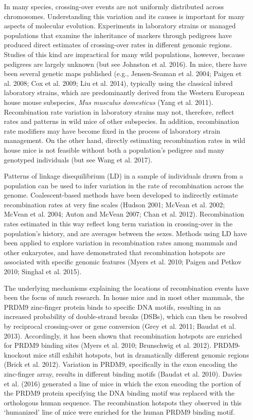 In many species, crossing-over events are not uniformly distributed across chromosomes. Understanding this variation and its causes is important for many aspects of molecular evolution. Experiments in laboratory strains or managed populations that examine the inheritance of markers through pedigrees have produced direct estimates of crossing-over rates in different genomic regions. Studies of this kind are impractical for many wild populations, however, because pedigrees are largely unknown (but see Johnston et al. 2016). In mice, there have been several genetic maps published (e.g., Jensen-Seaman et al. 2004; Paigen et al. 2008; Cox et al. 2009; Liu et al. 2014), typically using the classical inbred laboratory strains, which are predominantly derived from the Western European house mouse subspecies, \textit{Mus musculus domesticus} (Yang et al. 2011). Recombination rate variation in laboratory strains may not, therefore, reflect rates and patterns in wild mice of other subspecies. In addition, recombination rate modifiers may have become fixed in the process of laboratory strain management. On the other hand, directly estimating recombination rates in wild house mice is not feasible without both a population’s pedigree and many genotyped individuals (but see Wang et al. 2017). 
 
        	Patterns of linkage disequilibrium (LD) in a sample of individuals drawn from a population can be used to infer variation in the rate of recombination across the genome. Coalescent-based methods have been developed to indirectly estimate recombination rates at very fine scales (Hudson 2001; McVean et al. 2002; McVean et al. 2004; Auton and McVean 2007; Chan et al. 2012). Recombination rates estimated in this way reflect long term variation in crossing-over in the population’s history, and are averages between the sexes. Methods using LD have been applied to explore variation in recombination rates among mammals and other eukaryotes, and have demonstrated that recombination hotspots are associated with specific genomic features (Myers et al. 2010; Paigen and Petkov 2010; Singhal et al. 2015).

The underlying mechanisms explaining the locations of recombination events have been the focus of much research. In house mice and in most other mammals, the PRDM9 zinc-finger protein binds to specific DNA motifs, resulting in an increased probability of double-strand breaks (DSBs), which can then be resolved by reciprocal crossing-over or gene conversion (Grey et al. 2011; Baudat et al. 2013). Accordingly, it has been shown that recombination hotspots are enriched for PRDM9 binding sites (Myers et al. 2010; Brunschwig et al. 2012). PRDM9-knockout mice still exhibit hotspots, but in dramatically different genomic regions (Brick et al. 2012). Variation in PRDM9, specifically in the exon encoding the zinc-finger array, results in different binding motifs (Baudat et al. 2010). Davies et al. (2016) generated a line of mice in which the exon encoding the portion of the PRDM9 protein specifying the DNA binding motif was replaced with the orthologous human sequence. The recombination hotspots they observed in this ‘humanized’ line of mice were enriched for the human PRDM9 binding motif. 

